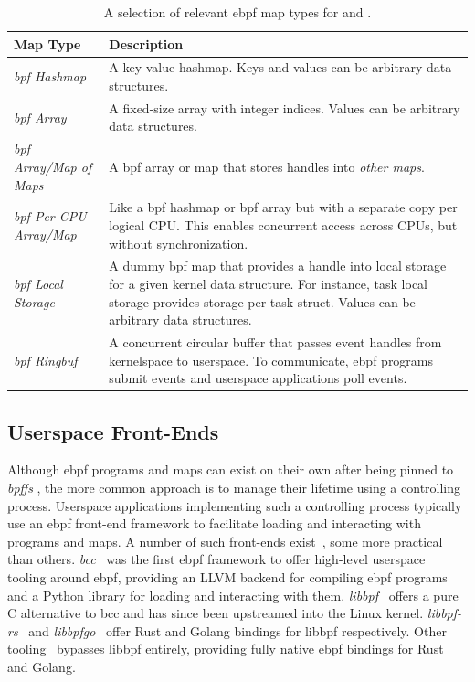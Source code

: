 \begingroup\footnotesize
\begin{longtable}[c]{lp{3.9in}}
\caption[A selection of relevant eBPF map types for \bpfbox{} and \bpfcontain{}]{A selection of relevant \gls{ebpf} map types for \bpfbox{} and \bpfcontain{}.}%
\label{tab:map-types}\\
  \toprule
  Map Type & Description\\
  \midrule
  \textit{\gls{bpf} Hashmap}           & A key-value hashmap. Keys and values can be arbitrary data structures.\\
  \textit{\gls{bpf} Array}             & A fixed-size array with integer indices. Values can be arbitrary data structures.\\
  \textit{\gls{bpf} Array/Map of Maps} & A \gls{bpf} array or map that stores handles into \textit{other maps}.\\
  \textit{\gls{bpf} Per-CPU Array/Map} & Like a \gls{bpf} hashmap or \gls{bpf} array but with a separate copy per logical CPU\@. This enables concurrent access across CPUs, but without synchronization.\\
  \textit{\gls{bpf} Local Storage}     & A dummy \gls{bpf} map that provides a handle into local storage for a given kernel data structure. For instance, task local storage provides storage per-task-struct. Values can be arbitrary data structures.\\
  \textit{\gls{bpf} Ringbuf}           & A concurrent circular buffer that passes event handles from kernelspace to userspace. To communicate, \gls{ebpf} programs submit events and userspace applications poll events.\\
  \bottomrule
\end{longtable}
\endgroup

\subsection{Userspace Front-Ends}%
\label{ss:bpf-userspace}

Although \gls{ebpf} programs and maps can exist on their own after being pinned to
\textit{bpffs} , the more common approach is to manage their lifetime using a controlling
process. Userspace applications implementing such a controlling process typically use an
\gls{ebpf} front-end framework to facilitate loading and interacting with programs and maps.
A number of such front-ends exist~\cite{gobpf, bcc, libbpf, libbpf-rs, libbpfgo,
cilium-ebpf, redbpf}, some more practical than others.
\textit{bcc}~\cite{bcc} was the first \gls{ebpf} framework to offer high-level userspace tooling
around \gls{ebpf}, providing an LLVM backend for compiling \gls{ebpf} programs and a Python library
for loading and interacting with them. \textit{libbpf}~\cite{libbpf} offers a pure
C alternative to bcc and has since been upstreamed into the Linux kernel.
\textit{libbpf-rs}~\cite{libbpf-rs} and \textit{libbpfgo}~\cite{libbpfgo} offer Rust
and Golang bindings for libbpf respectively. Other tooling~\cite{cilium-ebpf, redbpf}
bypasses libbpf entirely, providing fully native \gls{ebpf} bindings for Rust and Golang.

